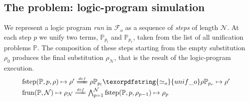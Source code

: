\documentclass[sigconf,natbib=false,review]{acmart}
\newcommand{\UnifRel}{\ensuremath{\simeq}}
\newcommand{\Uo}{\texorpdfstring{\ensuremath{\UnifRel_o}\xspace}{unif\_o}}
\newcommand{\Ue}{\ensuremath{\UnifRel_\lambda}\xspace}
\newcommand{\Fo}{\texorpdfstring{\ensuremath{\mathcal{F}_{\!o}\xspace}}{Fo}} %
\newcommand{\foUnifPb}{\ensuremath{\mathbb{P}}\xspace}
\begin{document}
\subsection{The problem: logic-program simulation}
We represent a logic program \emph{run} in \Fo{} as
a sequence of \emph{steps} of length $\mathcal{N}$.
At each step $p$ we unify two terms, $\foUnifPb_{p_l}$ and
$\foUnifPb_{p_r}$, taken from the list of all unification
problems \foUnifPb.
The composition of these steps starting from the
empty substitution $\rho_0$ produces the final
substitution $\rho_\mathcal{N}$, that is the result of the
logic-program execution.
%
\newcommand{\C}[4]{\ensuremath{\langle #1 \rangle}\mapsto(#2,#3,#4)}
\newcommand{\D}[4]{\ensuremath{\langle #1,#2,#3 \rangle^{-1}\mapsto #4}}
\newcommand{\progress}{\ensuremath{\mathrm{progress}}\xspace}
\newcommand{\fstep}{\ensuremath{\mathrm{fstep}}\xspace}
\newcommand{\hstep}{\ensuremath{\mathrm{hstep}}\xspace}
\newcommand{\frun}{\ensuremath{\mathrm{frun}}\xspace}
\newcommand{\hrun}{\ensuremath{\mathrm{hrun}}\xspace}
\newcommand{\stepF}[4]{\ensuremath{\fstep(#1,#2,#3) \mapsto #4}}
\newcommand{\stepFD}[4]{%
\ensuremath{#3 #1_{#2_l} \Uo #3 #1_{#2_r} \mapsto #4}}
\newcommand{\stepH}[6]{\ensuremath{\hstep(#1,#2,#3,#4) \mapsto (#5, #6)}}
\newcommand{\stepHD}[6]{\ensuremath{%
#3 #1_{#2_l} \Ue #3 #1_{#2_r} \mapsto #4 \land \progress(#6,#4) \mapsto (#6',#5)}}
\newcommand{\runF}[3]{\ensuremath{\frun(#1,#2) \mapsto #3_{#2}}}
\newcommand{\runFD}[2]{\ensuremath{%
\bigwedge_{p = 1}^{#2} \stepF{#1}{p}{\rho_{p-1}}{\rho_{p}}}}
\newcommand{\runH}[3]{\ensuremath{\hrun(#1,#2) \mapsto #3_{#2}}}
\newcommand{\runHD}[3]{\ensuremath{%
\bigwedge_{p = 1}^{#2} \stepH{#1}{p}{\sigma_{p-1}}{#3_{p-1}}{\sigma_{p}}{#3_p}}}
\newcommand{\deff}{\ensuremath{\stackrel{{\scriptscriptstyle def}}{=\!=\!\!\!=}}}
%
$$
\begin{array}{l}
\stepF{\foUnifPb}{p}{\rho}{\rho'}
\deff
\stepFD{\foUnifPb}{p}{\rho}{\rho'}\vspace{2pt}\\
\runF{\foUnifPb}{\mathcal{N}}{\rho}
\deff
\runFD{\foUnifPb}{\mathcal{N}}
\end{array}
$$
\end{document}
